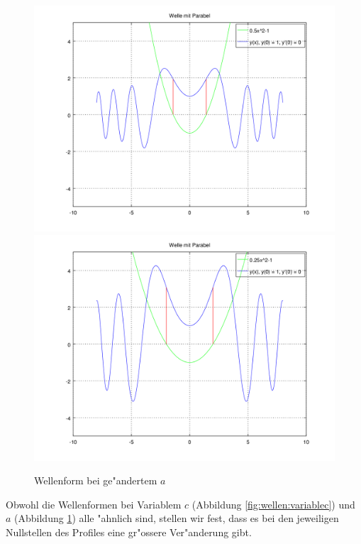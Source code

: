 \begin{figure}
	\includegraphics[scale=0.35]{./wellen/images/vara/ahalbe.png}
	\includegraphics[scale=0.35]{./wellen/images/vara/aviertel.png}
	\caption{Wellenform bei ge"andertem $a$}
	\label{fig:wellen:variablea}
\end{figure}

Obwohl die Wellenformen bei Variablem $c$ (Abbildung 
\ref{fig:wellen:variablec}) und $a$ (Abbildung \ref{fig:wellen:variablea}) 
alle "ahnlich sind, stellen wir fest, dass es bei den 
jeweiligen Nullstellen des Profiles eine gr"ossere Ver"anderung gibt.
